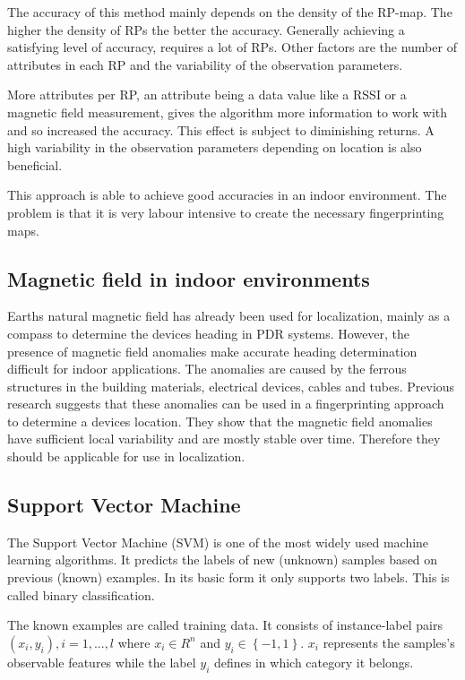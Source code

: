 The accuracy of this method mainly depends on the density of the RP-map. The higher the density of RPs the better the accuracy. Generally achieving a satisfying level of accuracy, requires a lot of RPs. Other factors are the number of attributes in each RP and the variability of the observation parameters.

More attributes per RP, an attribute being a data value like a RSSI or a magnetic field measurement, gives the algorithm more information to work with and so increased the accuracy\cite{Li2012feasableMagnetic}. This effect is subject to diminishing returns\cite{brouwers2014incremental}. A high variability in the observation parameters depending on location is also beneficial.

This approach is able to achieve good accuracies in an indoor environment. The problem is that it is very labour intensive to create the necessary fingerprinting maps.

\subsection{Magnetic field in indoor environments}

Earths natural magnetic field has already been used for localization, mainly as a compass to determine the devices heading in PDR systems. However, the presence of magnetic field anomalies make accurate heading determination difficult for indoor applications. The anomalies are caused by the ferrous structures in the building materials, electrical devices, cables and tubes. Previous research suggests that these anomalies can be used in a fingerprinting approach to determine a devices location\cite{haverinen2009global,angermann2012CharacterizationMagnetic,Li2012feasableMagnetic}. They show that the magnetic field anomalies have sufficient local variability and are mostly stable over time. Therefore they should be applicable for use in localization.

\subsection{Support Vector Machine}
\label{theory:SVM}
The Support Vector Machine (SVM) is one of the most widely used machine learning algorithms. It predicts the labels of new (unknown) samples based on previous (known) examples. In its basic form it only supports two labels. This is called binary classification.

The known examples are called training data. It consists of instance-label pairs \(\left ( x_{i}, y_{i} \right ), i=1,...,l\) where \(x_{i}\in R^{n}\) and \(y_{i}\in \left \{ -1,1 \right \}\). \(x_{i}\) represents the samples's observable features while the label \(y_{i}\) defines in which category it belongs.

